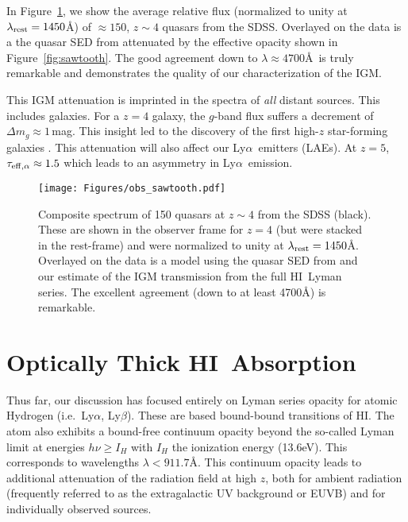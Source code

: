 \documentclass[graybox]{svmult}
\newcommand{\HI}{H{\sc I}}
\def\lya{Ly$\alpha$}
\def\lyb{Ly$\beta$}
\begin{document}
In Figure~\ref{fig:stack_saw}, we show the average 
relative flux (normalized to unity at $\lambda_{\rm rest} = 1450$\AA)
of $\approx 150$, $z \sim 4$ quasars from the SDSS.
Overlayed on the data is a the quasar SED from 
\cite{telfer02} attenuated by the effective opacity
shown in Figure~\ref{fig:sawtooth}.
The good agreement down to $\lambda \approx 4700$\AA\
is truly remarkable and demonstrates the quality of our
characterization of the IGM.

This IGM attenuation 
is imprinted in the spectra of {\it all} distant sources.
This includes galaxies.  
For a $z=4$ galaxy, the $g$-band flux suffers a decrement
of $\Delta m_g \approx 1$\,mag.
This insight  led to the discovery
of the first high-$z$ star-forming galaxies 
\cite{madau95,steidel96,koo}.
This attenuation will also affect our \lya\ emitters (LAEs).
At $z=5$, $\tau_{\rm eff, \alpha} \approx 1.5$ 
which leads to an asymmetry in \lya\ emission. 


%
\begin{figure}[b]
\sidecaption
\texttt{[image: Figures/obs\_sawtooth.pdf]}
%
%
\caption{Composite spectrum of 150 quasars at $z \sim 4$
from the SDSS (black).  These are shown in the observer
frame for $z=4$ (but were stacked in the rest-frame)
and were normalized to unity at $\lambda_{\rm rest} = 1450$\AA.
Overlayed on the data is a model using the quasar SED
from \cite{telfer+02} and our estimate of the IGM transmission
from the full \HI\ Lyman series.  The excellent agreement
(down to at least 4700\AA) is remarkable.
}
\label{fig:stack_saw}       %
\end{figure}

\section{Optically Thick \HI\ Absorption}

Thus far, our discussion has focused entirely on Lyman
series opacity for atomic Hydrogen (i.e.\ \lya, \lyb).
These are based bound-bound transitions of \HI.
The atom also exhibits a bound-free
continuum opacity beyond the so-called Lyman limit
at energies $h \nu \ge I_H$ with
$I_H$ the ionization energy (13.6eV).  This corresponds
to wavelengths $\lambda < 911.7$\AA.
This continuum opacity leads to additional attenuation
of the radiation field at high $z$, both for 
ambient radiation (frequently referred to as the
extragalactic UV background or EUVB) and 
for individually observed sources.
\end{document}
